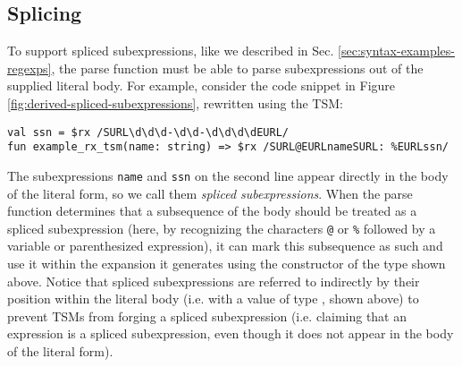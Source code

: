 

\subsection{Splicing}\label{sec:splicing-and-hygiene}
To support spliced subexpressions, like we described in Sec. \ref{sec:syntax-examples-regexps}, the parse function must be able to parse subexpressions out of the supplied literal body. For example, consider the code snippet in Figure \ref{fig:derived-spliced-subexpressions}, rewritten using the  TSM:
\begin{lstlisting}[numbers=none]
val ssn = $rx /SURL\d\d\d-\d\d-\d\d\d\dEURL/
fun example_rx_tsm(name: string) => $rx /SURL@EURLnameSURL: %EURLssn/
\end{lstlisting}
The subexpressions \lstinline{name} and \lstinline{ssn} on the second line appear directly in the body of the literal form, so we call them \emph{spliced subexpressions}. When the parse function determines that a subsequence of the body should be treated as a spliced subexpression (here, by recognizing the characters \lstinline{@} or \lstinline{%} followed by a variable or parenthesized expression), 
it can mark this subsequence as such and use it within the expansion it generates using the  constructor of the  type shown above. Notice that spliced subexpressions are referred to indirectly by their position within the literal body (i.e. with a value of type , shown above) to prevent TSMs from forging a spliced subexpression (i.e. claiming that an expression is a spliced subexpression, even though it does not appear in the body of the literal form). %

